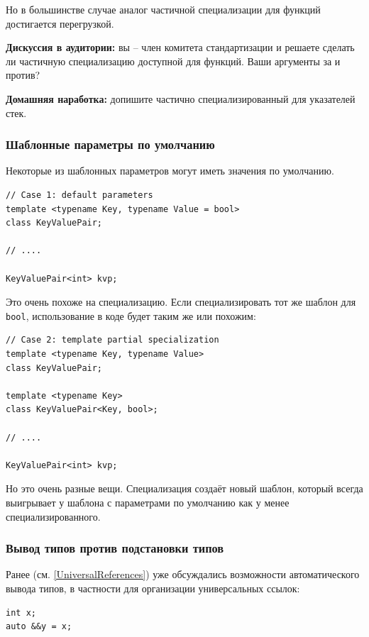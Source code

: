 \documentclass[a4paper,12pt,oneside]{article}
\begin{document}
Но в большинстве случае аналог частичной специализации для функций достигается перегрузкой.

\textbf{Дискуссия в аудитории:} вы -- член комитета стандартизации и решаете сделать ли частичную специализацию доступной для функций. Ваши аргументы за и против?

\textbf{Домашняя наработка:} допишите частично специализированный для указателей стек.

\subsubsection{Шаблонные параметры по умолчанию}

Некоторые из шаблонных параметров могут иметь значения по умолчанию.

\begin{lstlisting}
// Case 1: default parameters
template <typename Key, typename Value = bool>
class KeyValuePair;

// ....

KeyValuePair<int> kvp;
\end{lstlisting}

Это очень похоже на специализацию. Если специализировать тот же шаблон для \lstinline!bool!, использование в коде будет таким же или похожим:

\begin{lstlisting}
// Case 2: template partial specialization
template <typename Key, typename Value>
class KeyValuePair;

template <typename Key>
class KeyValuePair<Key, bool>;

// ....

KeyValuePair<int> kvp;
\end{lstlisting}

Но это очень разные вещи. Специализация создаёт новый шаблон, который всегда выигрывает у шаблона с параметрами по умолчанию как у менее специализированного.

\subsubsection{Вывод типов против подстановки типов}

Ранее (см. \ref{UniversalReferences}) уже обсуждались возможности автоматического вывода типов, в частности для организации универсальных ссылок:

\begin{lstlisting}
int x;
auto &&y = x;
\end{lstlisting}
\end{document}
